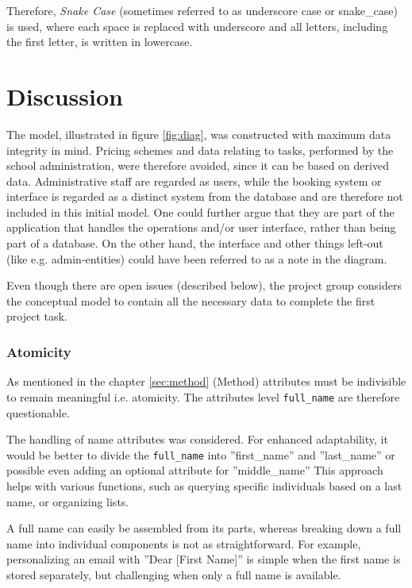 \documentclass[a4paper]{scrartcl}
\begin{document}
Therefore, \emph{Snake Case}
(sometimes referred to as underscore case or 
 snake\_case)
is used, where each space is replaced with underscore
and all letters, including the first letter, is written in lowercase. 

\pagebreak
\section{Discussion}
The model, illustrated in figure \ref{fig:diag}, was constructed with maximum
data integrity in mind.
Pricing schemes and data relating to tasks, performed by the school
administration, were therefore avoided, since it can be based on derived data.
Administrative staff are regarded as users, while the booking system or
interface is regarded as a distinct system from the database and are therefore
not included in this initial model. One could further argue that they are part
of the application that handles the operations and/or user interface, rather
than being part of a database.  
On the other hand, the interface and other things left-out (like e.g.
admin-entities) could have been referred to as a note in the diagram.  

Even though there are open issues (described below), the project group considers
the conceptual model to contain all the necessary data to complete the first
project task.  

\subsubsection*{Atomicity}
As mentioned in the chapter \ref{sec:method} (Method) 
attributes must be indivisible to
remain meaningful i.e. atomicity.
The attributes
level
\verb|full_name|
are therefore questionable.

The handling of name attributes was considered. 
For enhanced adaptability,  it
would be better to divide the 
\verb|full_name| into ''first\_name'' and ''last\_name'' or
possible even adding an optional attribute for ''middle\_name'' 
This approach helps with various functions, such as querying specific
individuals based on a last name, or organizing lists.

A full name can easily be assembled from its parts, 
whereas breaking down a full
name into individual components is not as straightforward. 
For example,
personalizing an email with ''Dear [First Name]'' 
is simple when the first name is
stored separately, but challenging when only a full name is available.
\end{document}
